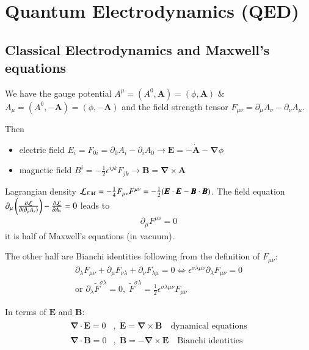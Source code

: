 \chapter{Quantum Electrodynamics (QED)}
\section{Classical Electrodynamics and Maxwell's equations}
We have the gauge potential $A^\mu = (A^0, \pmb{A}) = (\phi, \pmb{A})$ \& $A_\mu = (A^0, -\pmb{A}) = (\phi, -\pmb{A})$ and the field strength tensor $F_{\mu\nu} = \partial_\mu A_\nu - \partial_\nu A_\mu$.

Then
\begin{itemize}
	\item electric field $E_i = F_{0i} = \partial_0 A_i - \partial_i A_0 \rightarrow \pmb{E} = -\dot{\pmb{A}} - \pmb{\nabla} \phi$
	\item magnetic field $B^i = -\frac{1}{2} \epsilon^{ijk}F_{jk} \rightarrow \pmb{B} = \pmb{\nabla} \times \pmb{A}$
\end{itemize}

Lagrangian density $\mathcal{L}_{EM} = -\frac{1}{4}F_{\mu\nu}F^{\mu\nu} = -\frac{1}{2} (\pmb{E}\cdot\pmb{E} - \pmb{B}\cdot \pmb{B})$. The field equation $\partial_\mu \left( \frac{\partial \mathcal{L}}{\partial(\partial_\mu A_\nu)} \right) - \frac{\partial \mathcal{L}}{\partial A_\nu} = 0$ leads to
\begin{align}
	\partial_\mu F^{\mu\nu} = 0
\end{align}
it is half of Maxwell's equations (in vacuum).

The other half are Bianchi identities following from the definition of $F_{\mu\nu}$:
\begin{align*}
	\partial_\lambda F_{\mu\nu} + \partial_\mu F_{\nu\lambda} + \partial_\nu F_{\lambda\mu} = 0 \Leftrightarrow \epsilon^{\sigma \lambda \mu \nu}\partial_\lambda F_{\mu\nu} = 0\\
	\text{or } \partial_\lambda \tilde{F}^{\sigma\lambda} = 0,\; \tilde{F}^{\sigma\lambda} = \frac{1}{2} \epsilon^{\sigma\lambda\mu\nu}F_{\mu\nu}
\end{align*}

In terms of $\pmb{E}$ and $\pmb{B}$:
\begin{align*}
	\pmb{\nabla}\cdot \pmb{E} = 0&,\; \dot{\pmb{E}} = \pmb{\nabla}\times \pmb{B} \quad \text{dynamical equations} \\
	\pmb{\nabla}\cdot \pmb{B} = 0&,\; \dot{\pmb{B}} = -\pmb{\nabla}\times \pmb{E} \quad \text{Bianchi identities}
\end{align*}

